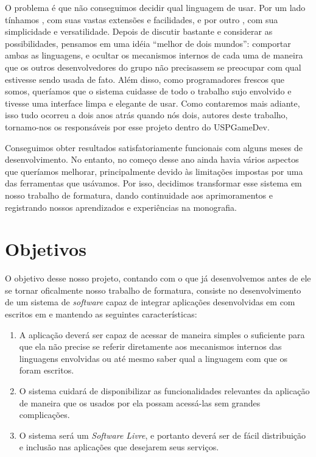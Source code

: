 O problema é que não conseguimos decidir qual linguagem de \script{} usar.
Por um lado tínhamos , com suas vastas extensões e facilidades, e
por outro , com sua simplicidade e versatilidade. Depois de discutir
bastante e considerar as possibilidades, pensamos em uma idéia ``melhor de dois
mundos'': comportar ambas as linguagens, e ocultar os mecanismos internos de
cada uma de maneira que os outros desenvolvedores do grupo não precisassem se
preocupar com qual estivesse sendo usada de fato. Além disso, como programadores
frescos que somos, queríamos que o sistema cuidasse de todo o trabalho sujo
envolvido e tivesse uma interface limpa e elegante de usar. Como contaremos mais
adiante, isso tudo ocorreu a dois anos atrás quando nós dois, autores deste
trabalho, tornamo-nos os responsáveis por esse projeto dentro do USPGameDev.

Conseguimos obter resultados satisfatoriamente funcionais com alguns meses de
desenvolvimento. No entanto, no começo desse ano ainda havia vários aspectos que
queríamos melhorar, principalmente devido às limitações impostas por uma das
ferramentas que usávamos. Por isso, decidimos transformar esse sistema em nosso
trabalho de formatura, dando continuidade aos aprimoramentos e registrando
nossos aprendizados e experiências na monografia.

\section{Objetivos}
\label{cap:intr:objetivos}

  O objetivo desse nosso projeto, contando com o que já desenvolvemos antes de
  ele se tornar oficalmente nosso trabalho de formatura, consiste no
  desenvolvimento de um sistema de \textit{software} capaz de integrar
  aplicações desenvolvidas em \CXX{} com  escritos em  e
   mantendo as seguintes características:
  
  \begin{enumerate}

    \item A aplicação deverá ser capaz de acessar  de maneira simples
          o suficiente para que ela não precise se referir diretamente aos
          mecanismos internos das linguagens envolvidas ou até mesmo saber qual a
          linguagem com que os  foram escritos.
    \item O sistema cuidará de disponibilizar as funcionalidades relevantes da
          aplicação de maneira que os  usados por ela possam acessá-las
          sem grandes complicações.
    \item O sistema será um \textit{Software Livre}, e portanto deverá ser de
          fácil distribuição e inclusão nas aplicações que desejarem seus
          serviços.

  \end{enumerate}

